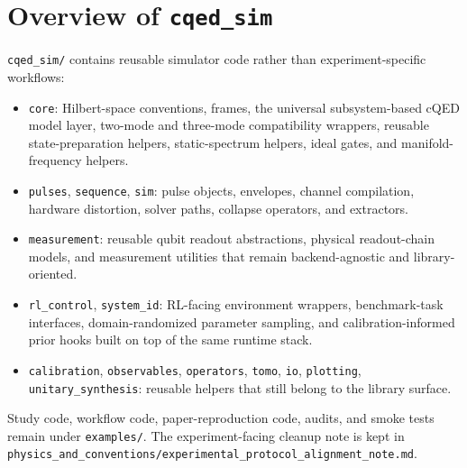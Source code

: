 \documentclass[11pt]{article}
\begin{document}
\section{Overview of \texttt{cqed\_sim}}
\texttt{cqed\_sim/} contains reusable simulator code rather than experiment-specific
workflows:
\begin{itemize}[leftmargin=1.5em]
  \item \texttt{core}: Hilbert-space conventions, frames, the universal subsystem-based
  cQED model layer, two-mode and three-mode compatibility wrappers, reusable
  state-preparation helpers, static-spectrum helpers, ideal gates, and
  manifold-frequency helpers.
  \item \texttt{pulses}, \texttt{sequence}, \texttt{sim}: pulse objects, envelopes,
  channel compilation, hardware distortion, solver paths, collapse operators,
  and extractors.
  \item \texttt{measurement}: reusable qubit readout abstractions, physical
  readout-chain models, and measurement utilities that remain backend-agnostic
  and library-oriented.
  \item \texttt{rl\_control}, \texttt{system\_id}: RL-facing environment wrappers,
  benchmark-task interfaces, domain-randomized parameter sampling, and
  calibration-informed prior hooks built on top of the same runtime stack.
  \item \texttt{calibration}, \texttt{observables}, \texttt{operators},
  \texttt{tomo}, \texttt{io}, \texttt{plotting}, \texttt{unitary\_synthesis}:
  reusable helpers that still belong to the library surface.
\end{itemize}

\noindent
Study code, workflow code, paper-reproduction code, audits, and smoke tests
remain under \texttt{examples/}. The experiment-facing cleanup note is kept in
\texttt{physics\_and\_conventions/experimental\_protocol\_alignment\_note.md}.
\end{document}
